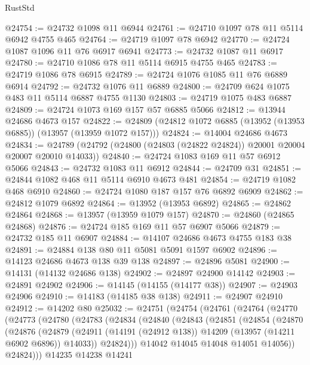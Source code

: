 \begin{lexlean}{RustStd}
\begin{coremodule}
@24754 := @24732 @1098 @11 @6944
@24761 := @24710 @1097 @78 @11 @5114 @6942 @4755 @465
@24764 := @24719 @1097 @78 @6942
@24770 := @24724 @1087 @1096 @11 @76 @6917 @6941
@24773 := @24732 @1087 @11 @6917
@24780 := @24710 @1086 @78 @11 @5114 @6915 @4755 @465
@24783 := @24719 @1086 @78 @6915
@24789 := @24724 @1076 @1085 @11 @76 @6889 @6914
@24792 := @24732 @1076 @11 @6889
@24800 := @24709 @624 @1075 @483 @11 @5114 @6887 @4755 @1130
@24803 := @24719 @1075 @483 @6887
@24809 := @24724 @1073 @169 @157 @57 @6885 @5066
@24812 := @13944 @24686 @4673 @157
@24822 := @24809 (@24812 @1072 @6885 (@13952 (@13953 @6885)) (@13957 (@13959 @1072 @157)))
@24824 := @14004 @24686 @4673
@24834 := @24789 (@24792 (@24800 (@24803 (@24822 @24824)) @20001 @20004 @20007 @20010 @14033))
@24840 := @24724 @1083 @169 @11 @57 @6912 @5066
@24843 := @24732 @1083 @11 @6912
@24844 := @24709 @31
@24851 := @24844 @1082 @468 @11 @5114 @6910 @4673 @481
@24854 := @24719 @1082 @468 @6910
@24860 := @24724 @1080 @187 @157 @76 @6892 @6909
@24862 := @24812 @1079 @6892
@24864 := @13952 (@13953 @6892)
@24865 := @24862 @24864
@24868 := @13957 (@13959 @1079 @157)
@24870 := @24860 (@24865 @24868)
@24876 := @24724 @185 @169 @11 @57 @6907 @5066
@24879 := @24732 @185 @11 @6907
@24884 := @14107 @24686 @4673 @4755 @183 @38
@24891 := @24884 @138 @80 @11 @5081 @5091 @1597 @6902
@24896 := @14123 @24686 @4673 @138 @39 @138
@24897 := @24896 @5081
@24900 := @14131 (@14132 @24686 @138)
@24902 := @24897 @24900 @14142
@24903 := @24891 @24902
@24906 := @14145 (@14155 (@14177 @38))
@24907 := @24903 @24906
@24910 := @14183 (@14185 @38 @138)
@24911 := @24907 @24910
@24912 := @14202 @80
@25032 := @24751
    (@24754
      (@24761
        (@24764
          (@24770
            (@24773
              (@24780
                (@24783
                  (@24834
                    (@24840
                      (@24843
                        (@24851
                          (@24854
                            (@24870
                              (@24876
                                (@24879
                                  (@24911
                                    (@14191 (@24912 @138))
                                    @14209
                                    (@13957 (@14211 @6902 @6896))
                                    @14033))
                                @24824)))
                          @14042
                          @14045
                          @14048
                          @14051
                          @14056))
                      @24824)))
                @14235
                @14238
                @14241

\end{coremodule}
\end{lexlean}
